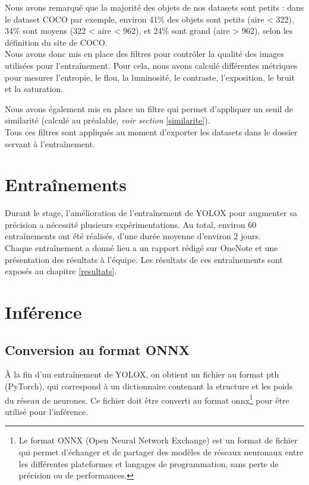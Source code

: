 Nous avons remarqué que la majorité des objets de nos datasets sont petits : 
dans le dataset COCO par exemple, environ 41\% des objets sont petits (aire < 322), 
34\% sont moyens (322 < aire < 962), et 24\% sont grand (aire > 962), selon 
les définition du site de COCO.\\

Nous avons donc mis en place des filtres pour contrôler la qualité des images 
utilisées pour l'entraînement. Pour cela, nous avons calculé différentes métriques
pour mesurer l'entropie, le flou, la luminosité, le contraste, l'exposition, le bruit et
la saturation. 

Nous avons également mis en place un filtre qui permet d'appliquer un seuil 
de similarité (calculé au préalable, \textit{voir section }\ref{similarite}).\\ 

Tous ces filtres sont appliqués au moment d'exporter les datasets dans le dossier 
servant à l'entraînement. 

\section{Entraînements}

Durant le stage, l'amélioration de l'entraînement de YOLOX pour augmenter sa précision 
a nécessité plusieurs expérimentations. Au total, environ 60 entraînements ont été réalisés,
d'une durée moyenne d'environ 2 jours. \\

Chaque entraînement a donné lieu a un rapport rédigé sur OneNote et une présentation des 
résultats à l'équipe. Les résultats de ces entraînements sont exposés au chapitre \ref{resultats}.

\section{Inférence}

\subsection{Conversion au format ONNX}

À la fin d'un entraînement de YOLOX, on obtient un fichier au format pth (PyTorch),
qui correspond à un dictionnaire contenant la structure et les poids du réseau de neurones.
Ce fichier doit être converti au format onnx\footnote{
Le format ONNX (Open Neural Network Exchange) est un format de fichier qui permet d'échanger 
et de partager des modèles de réseaux neuronaux entre les différentes plateformes et 
langages de programmation, sans perte de précision ou de performances.} 
pour être utilisé pour l'inférence.\\ 

